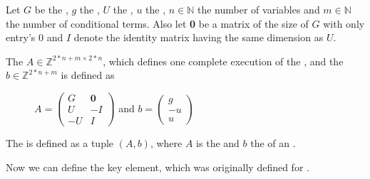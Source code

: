 \begin{definition}
	\label{def:iteration}
	Let $G$ be the \guardmatrix, $g$ the \guardconstants, $U$ the \updatematrix, $u$ the \updateconstants, $n\in \mathbb{N}$ the number of variables and $m \in \mathbb{N}$ the number of conditional terms. \newline
	Also let \textbf{0} be a matrix of the size of $G$ with only entry's 0 and $I$ denote the identity matrix having the same dimension as $U$. \newline
	
	The \iterationmatrix $A \in \mathbb{Z}^{2*n+m \times 2*n}$, which defines one complete execution of the \loopt, and the \iterationconstants $b\in \mathbb{Z}^{2*n+m} $ is defined as
	\begin{figure}[H]
		\centering
		$A = \begin{pmatrix} G & \textbf{0} \\ U & -I \\ -U & I \end{pmatrix}$ and $b = \begin{pmatrix} g \\ -u \\ u \end{pmatrix}$ \cite{leike2014geometric}
	\end{figure}	
\end{definition}

\begin{definition}[LOOP]
	The \loopt is defined as a tuple $(A, b)$, where $A$ is the \iterationmatrix and $b$ the \iterationconstants of an \its.
\end{definition}

Now we can define the key element, which was originally defined for . 

